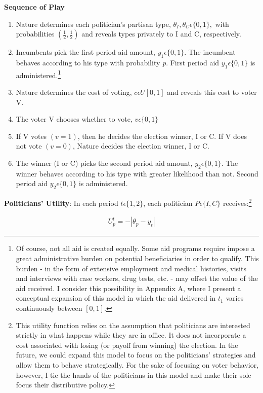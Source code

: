 \documentclass[12pt]{paper}
\begin{document}
\textbf{Sequence of Play}
\begin{enumerate}
	\item Nature determines each politician’s partisan type, $\theta_I, \theta_C \epsilon \{0,1\},$ with probabilities $(\frac{1}{2}, \frac{1}{2})$ and reveals types privately to I and C, respectively.
	\item Incumbents pick the first period aid amount, $y_1\epsilon \{0,1\}.$ The incumbent behaves according to his type with probability \textit{p}. First period aid $y_1\epsilon \{0,1\}$ is administered.\footnote{Of course, not all aid is created equally. Some aid programs require impose a great administrative burden on potential beneficiaries in order to qualify. This burden - in the form of extensive employment and medical histories, visits and interviews with case workers, drug tests, etc. - may offset the value of the aid received. I consider this possibility in Appendix A, where I present a conceptual expansion of this model in which the aid delivered in $t_1$ varies continuously between $[0,1]$.}
	\item Nature determines the cost of voting, $c \epsilon U[0,1]$ and reveals this cost to voter V.
	\item The voter V chooses whether to vote, $v \epsilon \{0,1\}$
	\item If V votes $(v=1)$, then he decides the election winner, I or C. If V does not vote $(v=0)$, Nature decides the election winner, I or C.
	\item The winner (I or C) picks the second period aid amount, $y_2 \epsilon \{0,1\}$. The winner behaves according to his type with greater likelihood than not. Second period aid  $y_2 \epsilon \{0,1\}$ is administered.
\end{enumerate}

\textbf{Politicians' Utility}: In each period $t \epsilon \{1,2\}$, each politician $P \epsilon \{I,C\}$ receives:\footnote{This utility function relies on the assumption that politicians are interested strictly in what happens while they are in office. It does not incorporate a cost associated with losing (or payoff from winning) the election. In the future, we could expand this model to focus on the politicians' strategies and allow them to behave strategically. For the sake of focusing on voter behavior, however, I tie the hands of the politicians in this model and make their sole focus their distributive policy.} 

\begin{gather}
U_{p}^t = -|\theta_p - y_t|
\end{gather}
\end{document}
